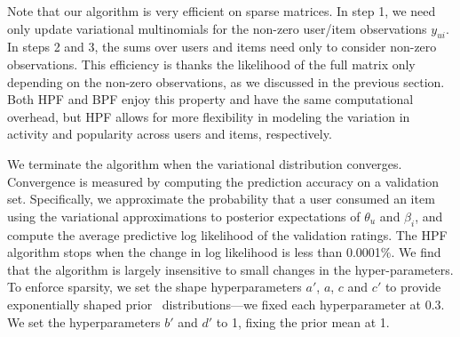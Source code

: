 Note that our algorithm is very efficient on sparse matrices. In step
1, we need only update variational multinomials for the non-zero
user/item observations $y_{ui}$.  In steps 2 and 3, the sums over
users and items need only to consider non-zero observations.  This
efficiency is thanks the likelihood of the full matrix only depending
on the non-zero observations, as we discussed in the previous section.
Both HPF and BPF enjoy this property and have the same computational
overhead, but HPF allows for more flexibility in modeling the variation
in activity and popularity across users and items, respectively.





We terminate the algorithm when the variational distribution
converges. Convergence is measured by computing the prediction
accuracy on a validation set.  Specifically, we approximate the
probability that a user consumed an item using the variational
approximations to posterior expectations of $\theta_u$ and $\beta_i$,
and compute the average predictive log likelihood of the validation
ratings. The HPF algorithm stops when the change in log likelihood is
less than 0.0001\%. We find that the algorithm
is largely insensitive to small changes in the hyper-parameters. To
enforce sparsity, we set the shape hyperparameters $a'$, $a$, $c$ and
$c'$ to provide exponentially shaped prior \gam~distributions---we
fixed each hyperparameter at $0.3$. We set the hyperparameters $b'$
and $d'$ to 1, fixing the prior mean at 1.

